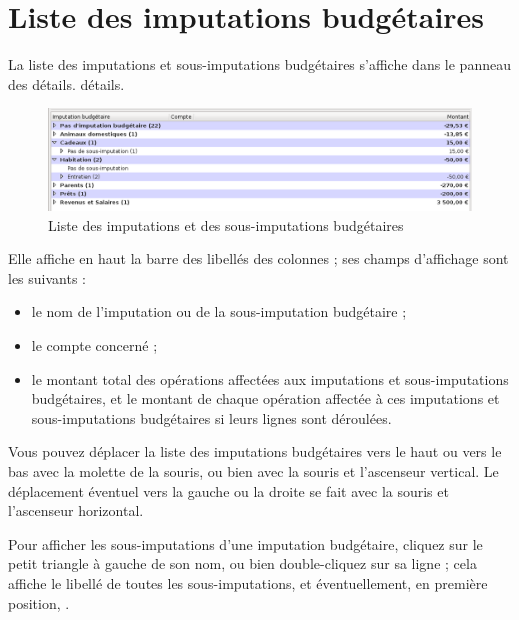 \section{Liste des imputations budgétaires\label{budgetarylines-list}}


La liste des imputations et sous-imputations budgétaires s'affiche dans le panneau des 
\ifIllustration détails.
\else détails.
\fi

\ifIllustration
\begin{figure}[htbp]
\begin{center}
\includegraphics[scale=0.5]{image/screenshot/budgetarylines_list}
\end{center}
\caption{Liste des imputations et des sous-imputations budgétaires}
\label{budgetarylines-list-img}
\end{figure}
\fi

Elle affiche en haut la barre des libellés des colonnes ; ses champs d'affichage sont les suivants :
\begin{itemize}
	 \item le nom de l'imputation ou de la sous-imputation budgétaire ;
	 \item le compte concerné ;
	 \item le montant total des opérations affectées aux imputations et sous-imputations budgétaires, et le montant de chaque opération affectée à ces imputations et sous-imputations budgétaires si leurs lignes sont déroulées.
\end{itemize}

Vous pouvez déplacer la liste des imputations budgétaires vers le haut ou vers le bas avec la molette de la souris, ou bien avec la souris et l'ascenseur vertical. Le déplacement éventuel vers la gauche ou la droite se fait avec la souris et l'ascenseur horizontal.

Pour  afficher les sous-imputations d'une imputation budgétaire, cliquez sur le petit triangle à gauche de son nom, ou bien double-cliquez sur sa ligne ;
 cela affiche le libellé  de toutes les sous-imputations, et éventuellement, en première position, .
 
